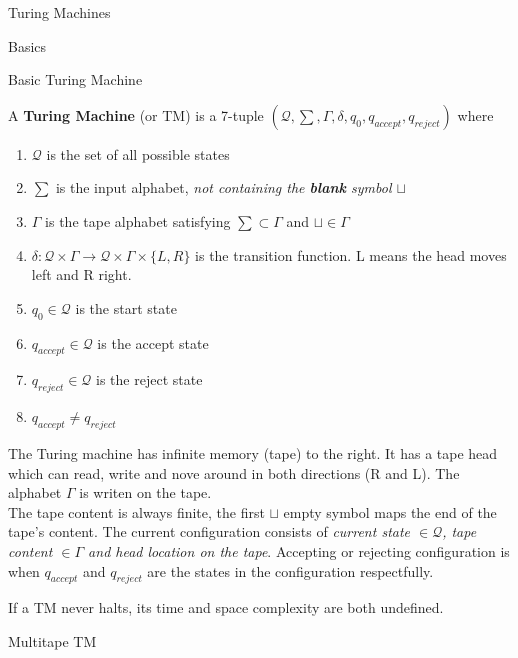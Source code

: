 \documentclass[12pt, letterpaper]{article}
\begin{document}
\begin{section}{Turing Machines}

  \begin{subsection}{Basics}

    \begin{subsubsection}{Basic Turing Machine}

      A \textbf{Turing Machine} (or TM) is a 7-tuple
      \((\mathcal{Q}, \sum, \Gamma, \delta, q_{0}, q_{accept}, q_{reject})\) where
      \begin{enumerate}
        \item \(\mathcal{Q}\) is the set of all possible states
        \item \(\sum\) is the input alphabet, \textit{not containing the \textbf{blank} symbol \(\sqcup\)}
        \item \(\Gamma\) is the tape alphabet satisfying \(\sum \subset \Gamma\) and \(\sqcup \in \Gamma\)
        \item \(\delta: \mathcal{Q} \times \Gamma \to \mathcal{Q} \times \Gamma \times \{{} L, R \}{}\)
              is the transition function. L means the head moves left and R right.
        \item \(q_{0} \in \mathcal{Q}\) is the start state
        \item \(q_{accept} \in \mathcal{Q}\) is the accept state
        \item \(q_{reject} \in \mathcal{Q}\) is the reject state
        \item \(q_{accept} \neq q_{reject}\)
      \end{enumerate}

      The Turing machine has infinite memory (tape) to the right. It has a tape head which
      can read, write and nove around in both directions (R and L). The alphabet \(\Gamma\)
      is writen on the tape. \\
      The tape content is always finite, the first \(\sqcup\) empty symbol maps the end of
      the tape's content. The current configuration consists of
      \emph{current state \(\in \mathcal{Q}\), tape content \(\in \Gamma\) and head location on the tape}.
      Accepting or rejecting configuration is when \(q_{accept}\) and \(q_{reject}\)
      are the states in the configuration respectfully.

      If a TM never halts, its time and space complexity are both undefined.

    \end{subsubsection}

    \begin{subsubsection}{Multitape TM}


\end{subsubsection}
\end{subsection}
\end{section}
\end{document}
